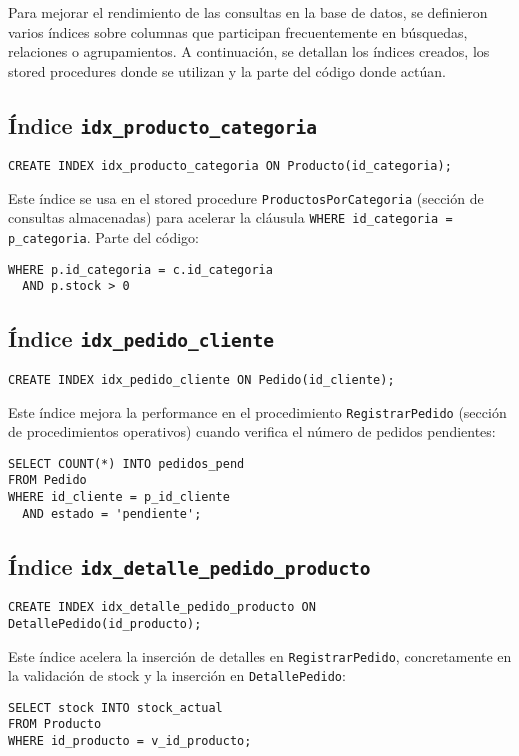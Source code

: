 

Para mejorar el rendimiento de las consultas en la base de datos, se definieron varios índices sobre columnas que participan frecuentemente en búsquedas, relaciones o agrupamientos. A continuación, se detallan los índices creados, los stored procedures donde se utilizan y la parte del código donde actúan.

\subsection{Índice \texttt{idx\_producto\_categoria}}
\begin{lstlisting}
CREATE INDEX idx_producto_categoria ON Producto(id_categoria);
\end{lstlisting}

Este índice se usa en el stored procedure \texttt{ProductosPorCategoria} (sección de consultas almacenadas) para acelerar la cláusula \texttt{WHERE id\_categoria = p\_categoria}. Parte del código:
\begin{lstlisting}
WHERE p.id_categoria = c.id_categoria
  AND p.stock > 0
\end{lstlisting}

\subsection{Índice \texttt{idx\_pedido\_cliente}}
\begin{lstlisting}
CREATE INDEX idx_pedido_cliente ON Pedido(id_cliente);
\end{lstlisting}

Este índice mejora la performance en el procedimiento \texttt{RegistrarPedido} (sección de procedimientos operativos) cuando verifica el número de pedidos pendientes:
\begin{lstlisting}
SELECT COUNT(*) INTO pedidos_pend
FROM Pedido
WHERE id_cliente = p_id_cliente
  AND estado = 'pendiente';
\end{lstlisting}

\subsection{Índice \texttt{idx\_detalle\_pedido\_producto}}
\begin{lstlisting}
CREATE INDEX idx_detalle_pedido_producto ON DetallePedido(id_producto);
\end{lstlisting}

Este índice acelera la inserción de detalles en \texttt{RegistrarPedido}, concretamente en la validación de stock y la inserción en \texttt{DetallePedido}:
\begin{lstlisting}
SELECT stock INTO stock_actual
FROM Producto
WHERE id_producto = v_id_producto;
\end{lstlisting}

